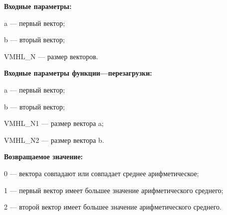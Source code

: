 \textbf{Входные параметры:}

a --- первый вектор;
 
b --- вторый вектор;
 
VMHL\_N --- размер векторов.
 
\textbf{Входные параметры функции---перезагрузки:}
 
a --- первый вектор;
 
b --- вторый вектор;
 
VMHL\_N1 --- размер вектора a;
 
VMHL\_N2 --- размер вектора b.

\textbf{Возвращаемое значение:}

0 --- вектора совпадают или совпадает среднее арифметическое;
 
1 --- первый вектор имеет большее значение арифметического среднего;
 
2 --- второй вектор имеет большее значение арифметического среднего.